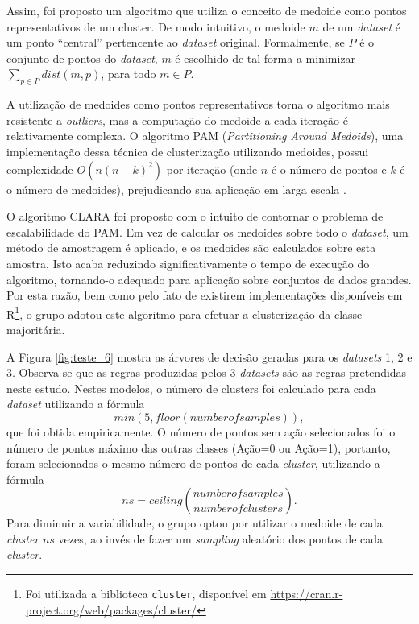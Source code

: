 Assim, foi proposto um algoritmo que utiliza o conceito de medoide como pontos representativos de um cluster. De modo intuitivo, o medoide $m$ de um \textit{dataset} é um ponto ``central'' pertencente ao \textit{dataset} original. Formalmente, se $P$ é o conjunto de pontos do \textit{dataset}, $m$ é escolhido de tal forma a minimizar $\sum_{p \in P}{dist(m,p)}$, para todo $m \in P$.

A utilização de medoides como pontos representativos torna o algoritmo mais resistente a \textit{outliers}, mas a computação do medoide a cada iteração é relativamente complexa. O algoritmo PAM (\textit{Partitioning Around Medoids}), uma implementação dessa técnica de clusterização utilizando medoides, possui complexidade $O\left(n(n-k)^2\right)$ por iteração (onde $n$ é o número de pontos e $k$ é o número de medoides), prejudicando sua aplicação em larga escala \cite{han2005}.

O algoritmo CLARA foi proposto com o intuito de contornar o problema de escalabilidade do PAM. Em vez de calcular os medoides sobre todo o \textit{dataset}, um método de amostragem é aplicado, e os medoides são calculados sobre esta amostra. Isto acaba reduzindo significativamente o tempo de execução do algoritmo, tornando-o adequado para aplicação sobre conjuntos de dados grandes. Por esta razão, bem como pelo fato de existirem implementações disponíveis em R\footnote{Foi utilizada a biblioteca \texttt{cluster}, disponível em \url{https://cran.r-project.org/web/packages/cluster/}}, o grupo adotou este algoritmo para efetuar a clusterização da classe majoritária.

A Figura \ref{fig:teste_6} mostra as árvores de decisão geradas para os \textit{datasets} 1, 2 e 3. Observa-se que as regras produzidas pelos 3 \textit{datasets} são as regras pretendidas neste estudo. Nestes modelos, o número de clusters foi calculado para cada \textit{dataset} utilizando a fórmula
\begin{equation*}
min(5, floor(number of samples)),
\end{equation*}
que foi obtida empiricamente. O número de pontos sem ação selecionados foi o número de pontos máximo das outras classes (Ação=0 ou Ação=1),
portanto, foram selecionados o mesmo número de pontos de cada \textit{cluster}, utilizando a fórmula
\begin{equation*}
ns = ceiling\left(\frac{number of samples}{number of clusters}\right).
\end{equation*}
Para diminuir a variabilidade, o grupo optou por utilizar o medoide de cada \textit{cluster} $ns$ vezes, ao invés de fazer um \textit{sampling} aleatório dos pontos de cada \textit{cluster}.


